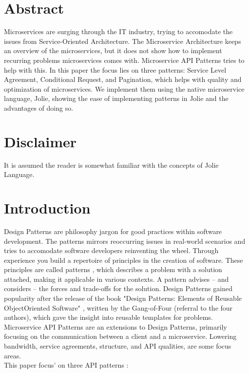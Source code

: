 \documentclass[12pt]{article}
\begin{document}

\tableofcontents
\newpage


\section{Abstract}
Microservices are surging through the IT industry, trying to accomodate the issues from Service-Oriented Architecture. The Microservice Architecture keeps an overview of the microservices, but it does not show how to implement recurring problems microservices comes with. Microservice API Patterns tries to help with this. In this paper the focus lies on three patterns: Service Level Agreement, Conditional Request, and Pagination, which helps with quality and optimization of microservices. We implement them using the native microservice language, Jolie, showing the ease of implementing patterns in Jolie and the advantages of doing so. 

\section{Disclaimer}
It is assumed the reader is somewhat familiar with the concepts of Jolie Language. 

\newpage

\section{Introduction}
Design Patterns are philosophy jargon for good practices within software development. The patterns mirrors reoccurring issues in real-world scenarios and tries to accomodate software developers reinventing the wheel. Through experience you build a repertoire of principles in the creation of software. These principles are called patterns \cite{Applying_Patterns}, which describes a problem with a solution attached, making it applicable in various contexts. A pattern advises -- and considers -- the forces and trade-offs for the solution. Design Patterns gained popularity after the release of the book "Design Patterns: Elements of Reusable Object\-Oriented Software" \cite{DesignPGoF}, written by the Gang-of-Four (referral to the four authors), which gave the insight into reusable templates for problems. Microservice API Patterns are an extensions to Design Patterns, primarily focusing on the communication between a client and a microservice. Lowering bandwidth, service agreements, structure, and API qualities, are some focus areas. \\
This paper focus' on three API patterns \cite{MAPIPweb}: 
\end{document}
